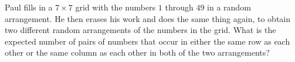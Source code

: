 Paul fills in a $7\times7$ grid with the numbers $1$ through $49$ in a random arrangement. He then erases his work and does the same thing again, to obtain two different random arrangements of the numbers in the grid. What is the expected number of pairs of numbers that occur in either the same row as each other or the same column as each other in both of the two arrangements?
